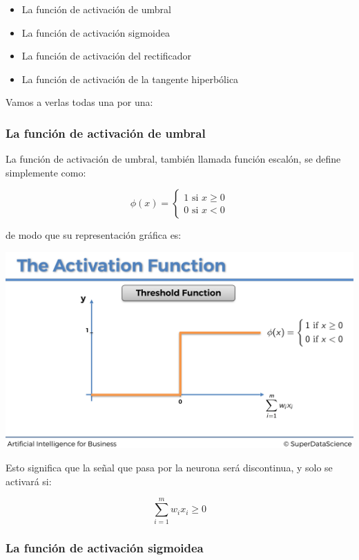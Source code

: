 \documentclass[
]{book}
\providecommand{\tightlist}{%
  \setlength{\itemsep}{0pt}\setlength{\parskip}{0pt}}
\begin{document}
\begin{itemize}
\tightlist
\item
  La función de activación de umbral
\item
  La función de activación sigmoidea
\item
  La función de activación del rectificador
\item
  La función de activación de la tangente hiperbólica
\end{itemize}

Vamos a verlas todas una por una:

\hypertarget{la-funciuxf3n-de-activaciuxf3n-de-umbral}{%
\subsubsection{La función de activación de umbral}\label{la-funciuxf3n-de-activaciuxf3n-de-umbral}}

La función de activación de umbral, también llamada función escalón, se define simplemente como:

\[
\phi(x) =
    \begin{cases}
        1 \textrm{ si } x \ge 0 \\
        0 \textrm{ si } x < 0
    \end{cases}
\]

de modo que su representación gráfica es:

\includegraphics{Images/ANN_10.png}

Esto significa que la señal que pasa por la neurona será discontinua, y solo se activará si:

\[\sum_{i=1}^m w_i x_i \ge 0\]

\hypertarget{la-funciuxf3n-de-activaciuxf3n-sigmoidea}{%
\subsubsection{La función de activación sigmoidea}\label{la-funciuxf3n-de-activaciuxf3n-sigmoidea}}
\end{document}
